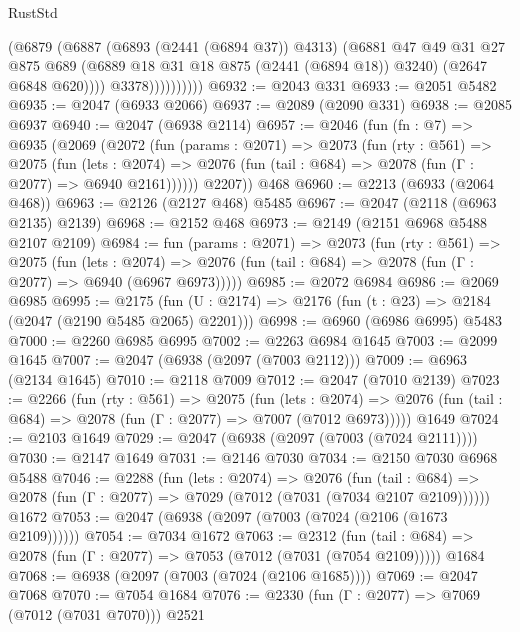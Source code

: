 \begin{lexlean}{RustStd}
\begin{coremodule}
                        (@6879
                          (@6887
                            (@6893 (@2441 (@6894 @37)) @4313)
                            (@6881
                              @47
                              @49
                              @31
                              @27
                              @875
                              @689
                              (@6889 @18 @31 @18 @875 (@2441 (@6894 @18)) @3240)
                              (@2647 @6848 @620))))
                        @3378))))))))))
@6932 := @2043 @331
@6933 := @2051 @5482
@6935 := @2047 (@6933 @2066)
@6937 := @2089 (@2090 @331)
@6938 := @2085 @6937
@6940 := @2047 (@6938 @2114)
@6957 := @2046
    (fun (fn : @7) =>
    @6935
      (@2069
        (@2072
          (fun (params : @2071) =>
          @2073
            (fun (rty : @561) =>
            @2075
              (fun (lets : @2074) =>
              @2076 (fun (tail : @684) => @2078 (fun (Γ : @2077) => @6940 @2161))))))
        @2207))
    @468
@6960 := @2213 (@6933 (@2064 @468))
@6963 := @2126 (@2127 @468) @5485
@6967 := @2047 (@2118 (@6963 @2135) @2139)
@6968 := @2152 @468
@6973 := @2149 (@2151 @6968 @5488 @2107 @2109)
@6984 := fun (params : @2071) =>
  @2073
    (fun (rty : @561) =>
    @2075
      (fun (lets : @2074) =>
      @2076 (fun (tail : @684) => @2078 (fun (Γ : @2077) => @6940 (@6967 @6973)))))
@6985 := @2072 @6984
@6986 := @2069 @6985
@6995 := @2175 (fun (U : @2174) => @2176 (fun (t : @23) => @2184 (@2047 (@2190 @5485 @2065) @2201)))
@6998 := @6960 (@6986 @6995) @5483
@7000 := @2260 @6985 @6995
@7002 := @2263 @6984 @1645
@7003 := @2099 @1645
@7007 := @2047 (@6938 (@2097 (@7003 @2112)))
@7009 := @6963 (@2134 @1645)
@7010 := @2118 @7009
@7012 := @2047 (@7010 @2139)
@7023 := @2266
    (fun (rty : @561) =>
    @2075
      (fun (lets : @2074) =>
      @2076 (fun (tail : @684) => @2078 (fun (Γ : @2077) => @7007 (@7012 @6973)))))
    @1649
@7024 := @2103 @1649
@7029 := @2047 (@6938 (@2097 (@7003 (@7024 @2111))))
@7030 := @2147 @1649
@7031 := @2146 @7030
@7034 := @2150 @7030 @6968 @5488
@7046 := @2288
    (fun (lets : @2074) =>
    @2076
      (fun (tail : @684) => @2078 (fun (Γ : @2077) => @7029 (@7012 (@7031 (@7034 @2107 @2109))))))
    @1672
@7053 := @2047 (@6938 (@2097 (@7003 (@7024 (@2106 (@1673 @2109))))))
@7054 := @7034 @1672
@7063 := @2312
    (fun (tail : @684) => @2078 (fun (Γ : @2077) => @7053 (@7012 (@7031 (@7054 @2109)))))
    @1684
@7068 := @6938 (@2097 (@7003 (@7024 (@2106 @1685))))
@7069 := @2047 @7068
@7070 := @7054 @1684
@7076 := @2330 (fun (Γ : @2077) => @7069 (@7012 (@7031 @7070))) @2521

\end{coremodule}
\end{lexlean}
